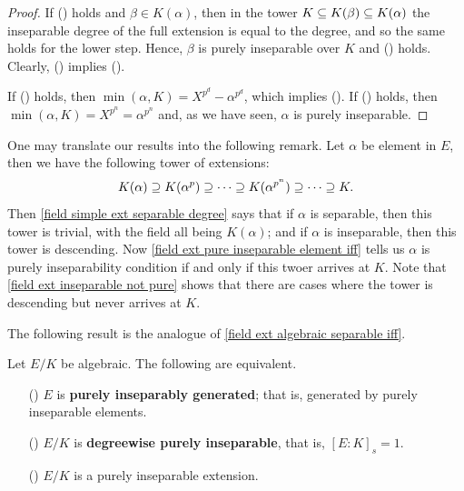\begin{proof}
If () holds and $\beta\in K(\alpha)$, then in the tower $K\subseteq K(\beta)\subseteq K(\alpha)$ the inseparable degree of the full extension is equal to the degree, and so the same holds for the lower step. Hence, $\beta$ is purely inseparable over $K$ and () holds. Clearly, () implies ().\par
If () holds, then $\min(\alpha,K)=X^{p^d}-\alpha^{p^d}$, which implies (). If () holds, then $\min(\alpha,K)=X^{p^n}=\alpha^{p^n}$ and, as we have seen, $\alpha$ is purely inseparable.
\end{proof}
One may translate our results into the following remark. Let $\alpha$ be  element in $E$, then we have the following tower of extensions:
\[K(\alpha)\supseteq K(\alpha^p)\supseteq\cdots\supseteq K(\alpha^{p^n})\supseteq\cdots\supseteq K.\]
Then \cref{field simple ext separable degree} says that if $\alpha$ is separable, then this tower is trivial, with the field all being $K(\alpha)$; and if $\alpha$ is inseparable, then this tower is descending. Now \cref{field ext pure inseparable element iff} tells us $\alpha$ is purely inseparability condition if and only if this twoer arrives at $K$. Note that \cref{field ext inseparable not pure} shows that there are cases where the tower is descending but never arrives at $K$.\par
The following result is the analogue of \cref{field ext algebraic separable iff}.
\begin{proposition}\label{field ext algebraic purely inseparable iff}
Let $E/K$ be algebraic. The following are equivalent.
\begin{itemize}
\item[(\rmnum{1})] $E$ is \textbf{purely inseparably generated}; that is, generated by purely inseparable elements.
\item[(\rmnum{2})] $E/K$ is \textbf{degreewise purely inseparable}, that is, $[E:K]_s=1$.
\item[(\rmnum{3})] $E/K$ is a purely inseparable extension.  
\end{itemize}
\end{proposition}
